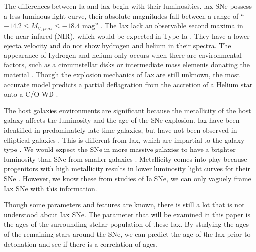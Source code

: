 \documentclass[preprint]{aastex}
\begin{document}
The differences between Ia and Iax begin with their luminosities.
Iax SNe possess a less luminous light curve, 
their absolute magnitudes fall between a range of 
``$-14.2 \leq M_{V,peak} \leq -18.4$ mag''
 \citep{fol1304}.
The Iax lack an observable second maxima in the near-infared (NIR),
which would be expected in Type Ia \citep{li03}. 
They have a lower ejecta velocity and do not show hydrogen and helium in their
 spectra.
The appearance of hydrogen and helium only occurs when there are environmental factors, such as  
a circumstellar disks or intermediate mass elements donating the material \citep{fol09}. 
Though the explosion mechanics of Iax are still unknown, the most accurate model
predicts a partial deflagration from the accretion of a Helium star 
onto a C/O WD \citep{krom13, fol1304}.

The host galaxies environments are significant because
the metallicity of the host galaxy affects the luminosity and the age of the
SNe explosion.
Iax have been identified in predominately late-time galaxies, 
but have not been observed in elliptical galaxies \citep{fol1304}. 
This is different from Iax, which are impartial to the galaxy type \citep{van92}. 
We would expect the SNe in more massive galaxies to have a brighter 
luminosity than SNe from smaller galaxies  \citep{fol1305}. 
Metallicity comes into play because progenitors with high 
metallicity results in lower luminosity light curves for their SNe \citep{tim03}. 
However, we know these from studies of Ia SNe, we can only vaguely frame Iax SNe with this information. 
 

Though some parameters and features are known, there is still a lot 
that is not understood about Iax SNe.
The parameter that will be examined in this paper is the ages 
of the surrounding stellar population of these Iax.
By studying the ages of the remaining stars around the SNe,
we can predict the age of the Iax prior to detonation and 
see if there is a correlation of ages.  
\end{document}
